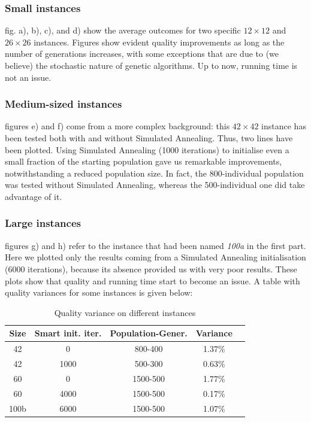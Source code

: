 \documentclass[letterpaper, 10 pt, conference]{ieeeconf}  %
\begin{document}
\subsubsection{Small instances} fig. a), b), c), and d) show
the average outcomes for two specific $12\times12$ and $26\times26$ instances. Figures show evident quality improvements as long as the number of generations increases, with some exceptions that are due to (we believe) the stochastic nature of genetic algorithms. Up to now, running time is not an issue.
\subsubsection{Medium-sized instances} figures e) and f) come from a more complex background: this $42\times42$ instance has been tested both with and without Simulated Annealing. Thus, two lines have been plotted. Using Simulated Annealing (1000 iterations) to initialise even a small fraction of the starting population gave us remarkable improvements, notwithstanding a reduced population size. In fact, the 800-individual population was tested without Simulated Annealing, whereas the 500-individual one did take advantage of it.
\subsubsection{Large instances} figures g) and h) refer to the instance that had been named \textit{100a} in the first part.
Here we plotted only the results coming from a Simulated Annealing initialisation (6000 iterations), because its absence 
provided us with very poor results. These plots show that quality 
and running time start to become an issue.
\newline
A table with quality variances for some instances is given below:
\begin{table}[h]
\caption{Quality variance on different instances}
\label{table_example}
\begin{center}
\begin{tabular}{|c|c|c|c|c|}
\hline
\textbf{Size} & \textbf{Smart init. iter.} & \textbf{Population-Gener.} & \textbf{Variance}\\
\hline
42 &  0 & 800-400 & 1.37\%\\
\hline
42 & 1000 & 500-300 & 0.63\% \\
\hline
60 & 0 & 1500-500 & 1.77\%\\
\hline
60 & 4000 & 1500-500 &  0.17\% \\
\hline
100b & 6000 & 1500-500 & 1.07\% \\
\hline
\end{tabular}
\end{center}
\end{table}
\end{document}
